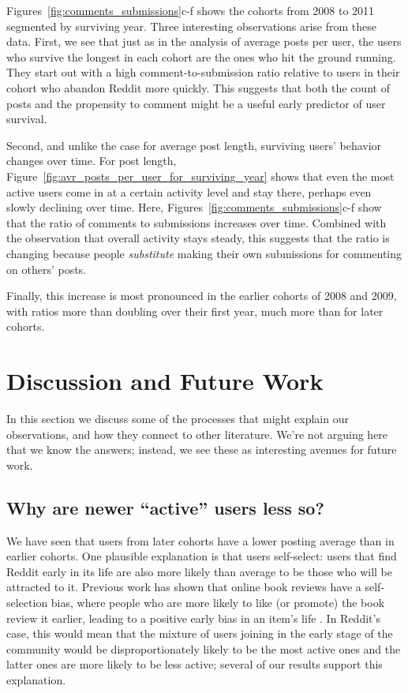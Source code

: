 \documentclass[10pt, oneside, onecolumn]{article}
\begin{document}
Figures~\ref{fig:comments_submissions}c-f shows the cohorts from 2008 to 2011 segmented by surviving year.  Three interesting observations arise from these data.  First, we see that just as in the analysis of average posts per user, the users who survive the longest in each cohort are the ones who hit the ground running.  They start out with a high comment-to-submission ratio relative to users in their cohort who abandon Reddit more quickly.  This suggests that both the count of posts and the propensity to comment might be a useful early predictor of user survival.

Second, and unlike the case for average post length, surviving users' behavior changes over time.  For post length, Figure~\ref{fig:avr_posts_per_user_for_surviving_year} shows that even the most active users come in at a certain activity level and stay there, perhaps even slowly declining over time.  Here, Figures~\ref{fig:comments_submissions}c-f show that the ratio of comments to submissions increases over time.  Combined with the observation that overall activity stays steady, this suggests that the ratio is changing because people \textit{substitute} making their own submissions for commenting on others' posts.

Finally, this increase is most pronounced in the earlier cohorts of 2008 and 2009, with ratios more than doubling over their first year, much more than for later cohorts.


\section{Discussion and Future Work}

In this section we discuss some of the processes that might explain our observations, and how they connect to other literature.  We're not arguing here that we know the answers; instead, we see these as interesting avenues for future work.  

\subsection{Why are newer ``active'' users less so?}

We have seen that users from later cohorts have a lower posting average than in earlier cohorts. 
One plausible explanation is that users self-select: users that find Reddit early in its life are also more likely than average to be those who will be attracted to it. Previous work has shown that online book reviews have a self-selection bias, where people who are more likely to like (or promote) the book review it earlier, leading to a positive early bias in an item's life \cite{Li2008}.  In Reddit's case, this would mean that the mixture of users joining in the early stage of the community would be disproportionately likely to be the most active ones and the latter ones are more likely to be less active; several of our results support this explanation.
\end{document}
